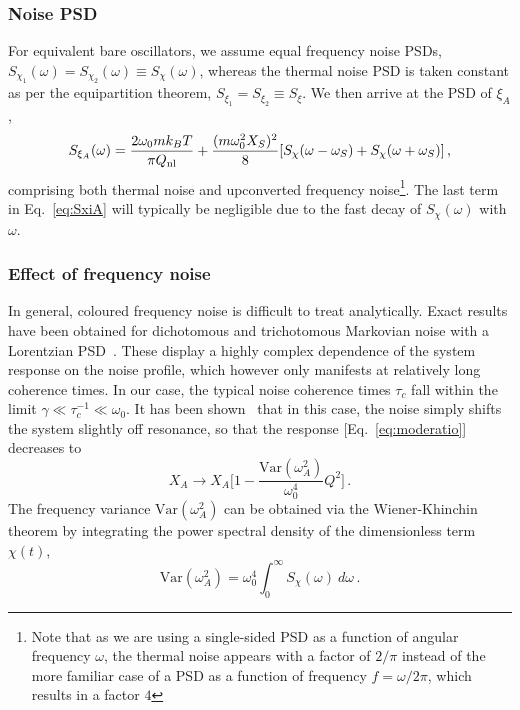 \subsubsection{Noise PSD} For equivalent bare oscillators, we assume equal frequency noise PSDs, $S_{\chi_1}(\omega) = S_{\chi_2}(\omega) \equiv S_\chi(\omega)$, whereas the thermal noise PSD is taken constant as per the equipartition theorem, $S_{\xi_1} = S_{\xi_2} \equiv S_\xi$. We then arrive at the PSD of $\xi_A$,
\begin{equation} \label{eq:SxiA}
S_{\xi_A}(\omega) = \frac{2\omega_0 m k_B T}{\pi Q_{\rm nl}} + \frac{(m \omega_0^2 X_S)^2}{8} [S_{\chi}(\omega - \omega_S) + S_\chi(\omega + \omega_S)] \,,
\end{equation}
comprising both thermal noise and upconverted frequency noise\footnote{Note that as we are using a single-sided PSD as a function of angular frequency $\omega$, the thermal noise appears with a factor of $2/\pi$ instead of the more familiar case of a PSD as a function of frequency $f = \omega/2\pi$, which results in a factor $4$}. The last term in Eq.~\eqref{eq:SxiA} will typically be negligible due to the fast decay of $S_\chi(\omega)$ with $\omega$.

\subsubsection{Effect of frequency noise} In general, coloured frequency noise is difficult to treat analytically. Exact results have been obtained for dichotomous and trichotomous Markovian noise with a Lorentzian PSD~\cite{Bourret_1973, Gitterman_2003, Mankin_2008}. These display a highly complex dependence of the system response on the noise profile, which however only manifests at relatively long coherence times. In our case, the typical noise coherence times $\tau_c$ fall within the limit $\gamma \ll \tau_c^{-1} \ll \omega_0$. It has been shown~\cite{Gitterman_2003} that in this case, the noise simply shifts the system slightly off resonance, so that the response [Eq.~\eqref{eq:moderatio}] decreases to
\begin{equation} \label{eq:varomega}
X_A \rightarrow X_A \bigg[1 - \frac{\text{Var}(\omega_A^2)}{\omega_0^4}Q^2\bigg] \,.
\end{equation}
The frequency variance $\text{Var}(\omega_A^2)$ can be obtained via the Wiener-Khinchin theorem by integrating the power spectral density of the dimensionless term $\chi(t)$,
\begin{equation} 
\text{Var}(\omega_A^2) = \omega_0^4 \int_0^\infty S_\chi(\omega) \:d\omega \,.
\end{equation}

